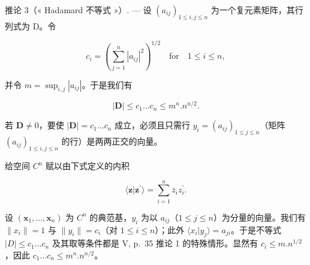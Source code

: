 推论 3（« Hadamard 不等式 »）. --- 设 \((a_{ij})_{1 \leqslant i,j \leqslant n}\) 为一个复元素矩阵，其行列式为 D。令

\[
c _ {i} = \left(\sum_ {j = 1} ^ {n} | a _ {i j} | ^ {2}\right) ^ {1 / 2} \quad \text {for} \quad 1 \leqslant i \leqslant n,
\]

并令 \(m = \sup_{i,j}|a_{ij}|\)。于是我们有

\[
| \mathbf {D} | \leqslant c _ {1} \dots c _ {n} \leqslant m ^ {n}. n ^ {n / 2}.\tag{41}
\]

若 \(\mathbf{D} \neq 0\)，要使 \(|\mathbf{D}| = c_1 \ldots c_n\) 成立，必须且只需行 \(y_i = (a_{ij})_{1 \leqslant j \leqslant n}\)（矩阵 \((a_{ij})_{1 \leqslant i,j \leqslant n}\) 的行）是两两正交的向量。

给空间 \(C^{n}\) 赋以由下式定义的内积

\[
\langle \mathbf {z} | \mathbf {z} ^ {\prime} \rangle = \sum_ {i = 1} ^ {n} \overline {{z}} _ {i} z _ {i} ^ {\prime}.
\]

设 \((\mathbf{x}_{1},\ldots,\mathbf{x}_{n})\) 为 \(C^{n}\) 的典范基，\(y_{i}\) 为以 \(a_{ij}\)（\(1\leqslant j\leqslant n\)）为分量的向量。我们有 \(\|x_{i}\|=1\) 与 \(\|y_{i}\|=c_{i}\)（对 \(1\leqslant i\leqslant n\)）；此外 \(\langle x_{i}|y_{j}\rangle=a_{ji}\)。于是不等式 \(|D|\leqslant c_{1}\ldots c_{n}\) 及其取等条件都是 V, p.~35 推论 1 的特殊情形。显然有 \(c_{i}\leqslant m.n^{1/2}\)，因此 \(c_{1}\ldots c_{n}\leqslant m^{n}.n^{n/2}\)。

